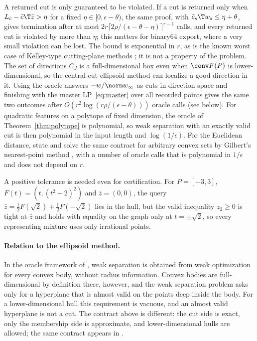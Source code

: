 A returned cut is only guaranteed to be violated. If a cut is returned only
when $L_{\bar c}-\bar c\T\bar z>\eta$ for a fixed $\eta\in[0,\epsilon-\theta)$, the same
proof, with $\bar c_s\T w_s\le\eta+\theta$, gives termination after at most
$2r\lceil2\rho/(\epsilon-\theta-\eta)\rceil^{r-1}$ calls, and every returned cut is
violated by more than $\eta$; this matters for binary64 export, where a very
small violation can be lost. The bound is exponential in $r$, as is the known
worst case of Kelley-type cutting-plane methods
\citep[see the discussion in][]{DroriTeboulle2016}; it is not a property of
the problem. The set of directions $C_J$ is a full-dimensional box even when
$\conv F(P)$ is lower-dimensional, so the central-cut ellipsoid method can
localize a good direction in it. Using the oracle answers $-w/\norm w_\infty$
as cuts in direction space and finishing with the master
LP~\eqref{eq:master} over all recorded points gives the same two outcomes
after $O(r^2\log(r\rho/(\epsilon-\theta)))$ oracle calls (see below). For
quadratic features on a polytope of fixed dimension, the oracle of
Theorem~\ref{thm:polytope} is polynomial, so weak separation with an exactly
valid cut is then polynomial in the input length and $\log(1/\epsilon)$. For the
Euclidean distance, \citet{BrierleyNavascuesVertesi2016} state and solve the
same contract for arbitrary convex sets by Gilbert's nearest-point method
\citep{Gilbert1966}, with a number of oracle calls that is polynomial in
$1/\epsilon$ and does not depend on $r$.

A positive tolerance is needed even for certification. For $P=[-3,3]$,
$F(t)=(t,(t^2-2)^2)$ and $\bar z=(0,0)$, the query
$\bar z=\tfrac12F(\sqrt2)+\tfrac12F(-\sqrt2)$ lies in the hull, but the valid
inequality $z_2\ge0$ is tight at $\bar z$ and holds with equality on the graph
only at $t=\pm\sqrt2$, so every representing mixture uses only irrational
points.

\paragraph{Relation to the ellipsoid method.}
In the oracle framework of \citet{GrotschelLovaszSchrijver1988}, weak
separation is obtained from weak optimization for every convex body, without
radius information. Convex bodies are full-dimensional by definition there,
however, and the weak separation problem asks only for a hyperplane that is
almost valid on the points deep inside the body. For a lower-dimensional hull
this requirement is vacuous, and an almost valid hyperplane is not a cut. The
contract above is different: the cut side is exact, only the membership side
is approximate, and lower-dimensional hulls are allowed; the same contract
appears in \citet{BrierleyNavascuesVertesi2016}.

